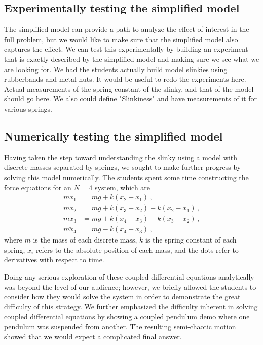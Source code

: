 \documentclass[aps,pre,10pt,superscriptaddress,showpacs,amsmath,amssymb,nofootinbib]{revtex4-1}
\newcommand{\nn}{\nonumber}
\begin{document}
\subsection{Experimentally testing the simplified model}
The simplified model can provide a path to analyze the effect of interest in the
full problem, but we would like to make sure that the simplified model also
captures the effect.  We can test this experimentally by building an experiment
that is exactly described by the simplified model and making sure we see what we
are looking for.  We had the students actually build model slinkies using
rubberbands and metal nuts.  It would be useful to redo the experiments here.
Actual measurements of the spring constant of the slinky, and that of the model 
should go here.  We also could define "Slinkiness" and have measurements of it
for various springs.


\subsection{Numerically testing the simplified model}
Having taken the step toward understanding the slinky using a model with
discrete masses separated by springs, we sought to make further progress by
solving this model numerically. The students spent some time constructing the
force equations for an $N=4$ system, which are
\begin{align} \label{eq:coupleddes}
m\ddot{x}_1 &= mg + k(x_2 - x_1)\,,
\nn\\
m\ddot{x}_2 &= mg + k(x_3 - x_2) - k(x_2 - x_1)
\,,\nn\\
m\ddot{x}_3 &= mg + k(x_4 - x_3) - k(x_3 - x_2)
\,,\nn\\
m\ddot{x}_4 &= mg                - k(x_4 - x_3)
\,,\end{align}
where $m$ is the mass of each discrete mass, $k$ is the spring constant of each
spring, $x_i$ refers to the absolute position of each mass, and the dots refer to
derivatives with respect to time.

Doing any serious exploration of these coupled differential equations
analytically was beyond the level of our audience; however, we briefly allowed
the students to consider how they would solve the system in order to demonstrate
the great difficulty of this strategy. We further emphasized the difficulty inherent in
solving coupled differential equations by showing a coupled pendulum demo where
one pendulum was suspended from another. The resulting semi-chaotic motion
showed that we would expect a complicated final answer.
\end{document}
